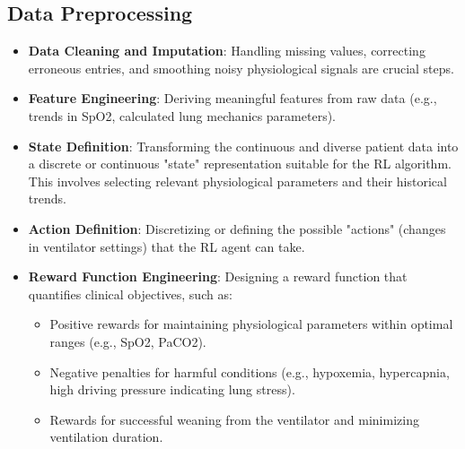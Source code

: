 \subsection*{Data Preprocessing}
\begin{itemize}
    \item \textbf{Data Cleaning and Imputation}: Handling missing values, correcting erroneous entries, and smoothing noisy physiological signals are crucial steps.
    \item \textbf{Feature Engineering}: Deriving meaningful features from raw data (e.g., trends in SpO2, calculated lung mechanics parameters).
    \item \textbf{State Definition}: Transforming the continuous and diverse patient data into a discrete or continuous "state" representation suitable for the RL algorithm. This involves selecting relevant physiological parameters and their historical trends.
    \item \textbf{Action Definition}: Discretizing or defining the possible "actions" (changes in ventilator settings) that the RL agent can take.
    \item \textbf{Reward Function Engineering}: Designing a reward function that quantifies clinical objectives, such as:
    \begin{itemize}
        \item Positive rewards for maintaining physiological parameters within optimal ranges (e.g., SpO2, PaCO2).
        \item Negative penalties for harmful conditions (e.g., hypoxemia, hypercapnia, high driving pressure indicating lung stress).
        \item Rewards for successful weaning from the ventilator and minimizing ventilation duration.
    \end{itemize}
\end{itemize}

